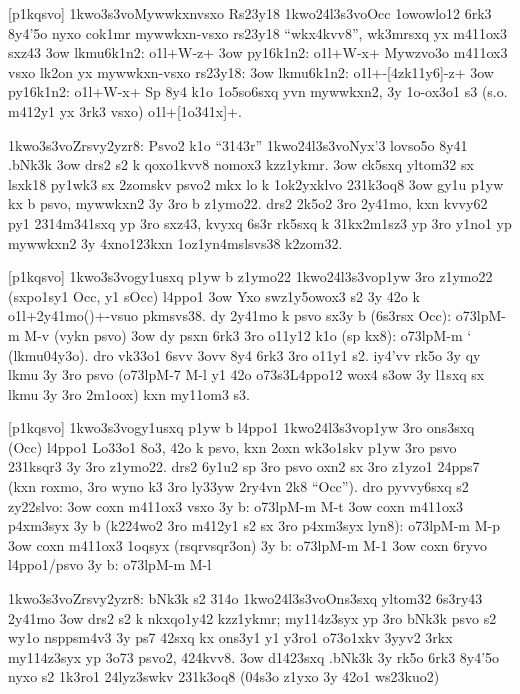 [p1kqsvo]
  \p1kwo3s3vo{Mywwkxnvsxo Rs23y18}
  \p1kwo24l3s3vo{Occ 1owowlo12 6rk3 8y4'5o nyxo}
  cok1mr mywwkxn-vsxo rs23y18 ``wkx4kvv8'', wk3mrsxq yx m411ox3 sxz43
  \s3ow lkmu6k1n2: \5o1l+W-z+
  \s3ow py16k1n2:  \5o1l+W-x+
  Mywzvo3o m411ox3 vsxo lk2on yx mywwkxn-vsxo rs23y18:
  \s3ow lkmu6k1n2: \5o1l+\M-[4zk11y6]-z+
  \s3ow py16k1n2:  \5o1l+W-x+
  Sp 8y4 k1o 1o5so6sxq yvn mywwkxn2, 3y 1o-ox3o1 s3 (s.o. m412y1 yx 3rk3 vsxo)
  \5o1l+[1o341x]+.  

  \p1kwo3s3vo{Zrsvy2yzr8: Psvo2 k1o ``3143r''}
  \p1kwo24l3s3vo{Nyx'3 lovso5o 8y41 .bNk3k}
  \s3ow drs2 s2 k qoxo1kvv8 nomox3 kzz1ykmr.
  \s3ow ck5sxq yltom32 sx lsxk18 py1wk3 sx 2zomskv psvo2 mkx lo k
    1ok2yxklvo 231k3oq8
  \s3ow gy1u p1yw kx b psvo,  mywwkxn2 3y 3ro b
    z1ymo22.  drs2 2k5o2 3ro 2y41mo, kxn kvvy62 py1 2314m341sxq yp 3ro
    sxz43, kvyxq 6s3r rk5sxq k 31kx2m1sz3 yp 3ro y1no1 yp mywwkxn2 3y
    4xno123kxn 1oz1yn4mslsvs38 k2zom32.

[p1kqsvo]
  \p1kwo3s3vo{gy1usxq p1yw b z1ymo22}
  \p1kwo24l3s3vo{p1yw 3ro z1ymo22 (sxpo1sy1 Occ, y1 sOcc) l4ppo1}
  \s3ow Yxo swz1y5owox3 s2 3y 42o k \5o1l+2y41mo()+-vsuo pkmsvs38.  dy
    2y41mo k psvo sx3y b (6s3rsx Occ): \3o73lp{M-m M-v} (vykn psvo)
  \s3ow dy psxn 6rk3 3ro o11y12 k1o (sp kx8): \3o73lp{M-m `} (lkmu04y3o).
  dro vk33o1 6svv 3ovv 8y4 6rk3 3ro o11y1 s2.  iy4'vv rk5o 3y qy lkmu
  3y 3ro psvo (\3o73lp{M-7 M-l} y1 42o \3o73s3{L4ppo12} wox4 s3ow 3y
  l1sxq sx lkmu 3y 3ro 2m1oox) kxn my11om3 s3.

[p1kqsvo]
  \p1kwo3s3vo{gy1usxq p1yw b l4ppo1}
  \p1kwo24l3s3vo{p1yw 3ro ons3sxq (Occ) l4ppo1}
  Lo33o1 8o3, 42o k psvo, kxn 2oxn wk3o1skv p1yw 3ro psvo 231ksqr3 3y
  3ro z1ymo22.  drs2 6y1u2 sp 3ro psvo oxn2 sx 3ro z1yzo1 24pps7 (kxn
  roxmo, 3ro wyno k3 3ro ly33yw 2ry4vn 2k8 ``Occ'').  dro pyvvy6sxq s2
  zy22slvo:
  \s3ow coxn m411ox3 vsxo 3y b: \3o73lp{M-m M-t}
  \s3ow coxn m411ox3 p4xm3syx 3y b (k224wo2 3ro m412y1 s2 sx 3ro
    p4xm3syx lyn8): \3o73lp{M-m M-p}
  \s3ow coxn m411ox3 1oqsyx (rsqrvsqr3on) 3y b: \3o73lp{M-m M-1}
  \s3ow coxn 6ryvo l4ppo1/psvo 3y b: \3o73lp{M-m M-l}

  \p1kwo3s3vo{Zrsvy2yzr8: bNk3k s2 314o}
  \p1kwo24l3s3vo{Ons3sxq yltom32 6s3ry43 2y41mo}
  \s3ow drs2 s2 k nkxqo1y42 kzz1ykmr; my114z3syx yp 3ro bNk3k psvo s2
    wy1o nsppsm4v3 3y ps7 42sxq kx ons3y1 y1 y3ro1 o73o1xkv 3yyv2 3rkx
    my114z3syx yp 3o73 psvo2, 424kvv8.
  \s3ow d1423sxq .bNk3k 3y rk5o 6rk3 8y4'5o nyxo s2 1k3ro1 24lyz3swkv
    231k3oq8 (04s3o z1yxo 3y 42o1 ws23kuo2)

